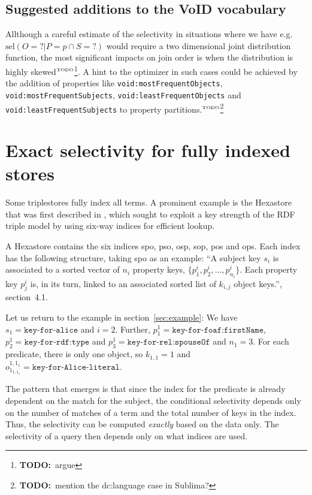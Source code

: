 \documentclass[12pt, draft]{article}
\newcommand{\rdfterm}[1]{\texttt{#1}}
\newcommand{\todo}[1]{\ensuremath{^{\textrm{\tiny{TODO}\normalsize}}}\footnote{\textbf{TODO:}~#1}}
\newcommand{\sel}[1]{\ensuremath{\mathrm{sel}\left(#1\right)}}
\begin{document}
\subsection{Suggested additions to the VoID vocabulary}

Allthough a careful estimate of the selectivity in situations where we
have e.g. $\sel{O = ? | P = p \cap S = ?}$ would require a two
dimensional joint distribution function, the most significant impacts on
join order is when the distribution is highly skewed\todo{argue}. A
hint to the optimizer in such cases could be achieved by the addition
of properties like \rdfterm{void:mostFrequentObjects},
\rdfterm{void:mostFrequentSubjects},
\rdfterm{void:leastFrequentObjects} and 
\rdfterm{void:leastFrequentSubjects} to property
partitions.\todo{mention the dc:language case in Sublima?}

\section{Exact selectivity for fully indexed stores}

Some triplestores fully index all terms. A prominent example is the
Hexastore that was first described in
\cite{Weiss:2008:HSI:1453856.1453965}, which sought to exploit a key
strength of the RDF triple model by using six-way indices for
efficient lookup.

A Hexastore contains the six indices \textsf{spo}, \textsf{pso},
\textsf{osp}, \textsf{sop}, \textsf{pos} and \textsf{ops}. Each index
has the following structure, taking \textsf{spo} as an example: ``A
subject key $s_i$ is associated to a sorted vector of $n_i$ property
keys, $\{p_1^i , p_2^i , \ldots , p^i_{n_i} \}$. Each property key $p_j^i$
is, in its turn, linked to an associated sorted list of $k_{i,j}$
object keys.''\cite{Weiss:2008:HSI:1453856.1453965}, section~4.1.

Let us return to the example in section~\ref{sec:example}: We have
$s_1 = \texttt{key-for-alice}$ and $i=2$. Further, $p_1^1 =
\texttt{key-for-foaf:firstName}$, $p_2^1 = \texttt{key-for-rdf:type}$ and $p_3^1 =
\texttt{key-for-rel:spouseOf}$ and $n_1 = 3$. For each predicate, there is only
one object, so $k_{1,1} = 1$ and $o_{1_{1,1_1}}^{1,1_1} = \texttt{key-for-Alice-literal}$.

The pattern that emerges is that since the index for the predicate is
already dependent on the match for the subject, the conditional
selectivity depends only on the number of matches of a term and the
total number of keys in the index. Thus, the selectivity can be
computed \emph{exactly} based on the data only. The selectivity of a
query then depends only on what indices are used. 
\end{document}
